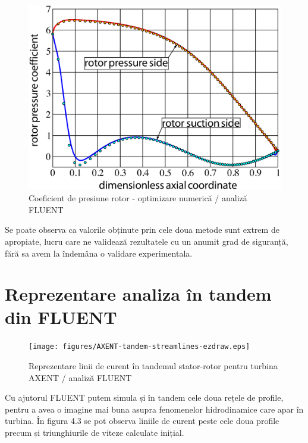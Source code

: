 \begin{figure}[h]
	\centering
	\includegraphics[scale=0.5]{figures/cp-rotor-ezdraw.eps}
	\caption{Coeficient de presiune rotor - optimizare numerică / analiză FLUENT}
	\label{Coeficient de presiune rotor - optimizare numerică / analiză FLUENT}
\end{figure}

Se poate observa ca valorile obținute prin cele doua metode sunt extrem de apropiate, lucru care ne validează rezultatele cu un anumit grad de siguranță, fără sa avem la îndemâna o validare experimentala.

\clearpage


\section{Reprezentare analiza în tandem din FLUENT}

\begin{figure}[h]
	\centering
	\texttt{[image: figures/AXENT-tandem-streamlines-ezdraw.eps]}
	\caption{Reprezentare linii de curent în tandemul stator-rotor pentru turbina AXENT / analiză FLUENT}
	\label{Reprezentare linii de curent în tandemul stator-rotor pentru turbina AXENT / analiză FLUENT}
\end{figure}

Cu ajutorul FLUENT putem simula și în tandem cele doua rețele de profile, pentru a avea o imagine mai buna asupra fenomenelor hidrodinamice care apar în turbina. În figura 4.3 se pot observa liniile de curent peste cele doua profile precum și triunghiurile de viteze calculate inițial.

\clearpage